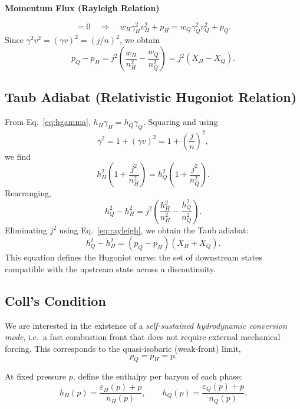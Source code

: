 \documentclass[superscriptaddress,amsmath,floatfix,aps,prc,twocolumn]{revtex4-1}
\begin{document}
\textbf{Momentum Flux (Rayleigh Relation)}

\begin{equation}
[T^{xx}]=0
\quad \Rightarrow \quad
w_H \gamma_H^2 v_H^2 + p_H = w_Q \gamma_Q^2 v_Q^2 + p_Q .
\end{equation}
Since $\gamma^2 v^2 = (\gamma v)^2 = (j/n)^2$, we obtain
\begin{equation}
p_Q - p_H
=
j^2 \left( \frac{w_H}{n_H^2} - \frac{w_Q}{n_Q^2} \right)
=
j^2 (X_H - X_Q) .
\label{eq:rayleigh}
\end{equation}

\subsection*{Taub Adiabat (Relativistic Hugoniot Relation)}

From Eq.~\eqref{eq:hgamma}, $h_H \gamma_H = h_Q \gamma_Q$.
Squaring and using
\begin{equation}
\gamma^2 = 1 + (\gamma v)^2 = 1 + \left(\frac{j}{n}\right)^2 ,
\end{equation}
we find
\begin{equation}
h_H^2 \left( 1 + \frac{j^2}{n_H^2} \right)
=
h_Q^2 \left( 1 + \frac{j^2}{n_Q^2} \right).
\end{equation}
Rearranging,
\begin{equation}
h_Q^2 - h_H^2
=
j^2 \left( \frac{h_H^2}{n_H^2} - \frac{h_Q^2}{n_Q^2} \right).
\end{equation}
Eliminating $j^2$ using Eq.~\eqref{eq:rayleigh}, we obtain the Taub adiabat:
\begin{equation}
h_Q^2 - h_H^2
=
(p_Q - p_H)(X_H + X_Q).
\label{eq:taub}
\end{equation}
This equation defines the Hugoniot curve: the set of downstream states compatible with
the upstream state across a discontinuity.

\subsection*{Coll's Condition}

We are interested in the existence of a \emph{self-sustained hydrodynamic conversion mode},
i.e.\ a fast combustion front that does not require external mechanical forcing.
This corresponds to the quasi-isobaric (weak-front) limit,
\begin{equation}
p_Q = p_H = p .
\end{equation}

At fixed pressure $p$, define the enthalpy per baryon of each phase:
\begin{equation}
h_H(p) = \frac{\varepsilon_H(p)+p}{n_H(p)},
\qquad
h_Q(p) = \frac{\varepsilon_Q(p)+p}{n_Q(p)} .
\end{equation}
\end{document}
